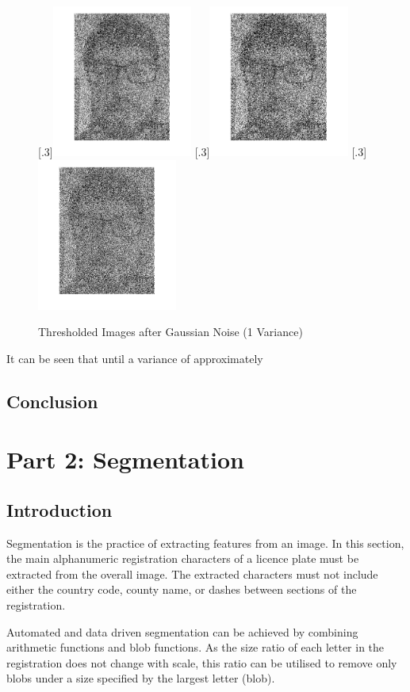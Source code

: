 \documentclass[a4paper]{article}
\begin{document}
	\begin{figure}[H]
		\centering
		[.3\linewidth]{\includegraphics[height=5cm]{Results/Q1/d/qdVar1.jpg}}%
		[.3\linewidth]{\includegraphics[height=5cm]{Results/Q1/d/qdThresh1.jpg}}%
		[.3\linewidth]{\includegraphics[height=5cm]{Results/Q1/d/qd5x51.jpg}}%
		\caption{Thresholded Images after Gaussian Noise (1 Variance)}
		\label{fig:}
	\end{figure}
	\par It can be seen that until a variance of approximately
	\subsection{Conclusion}
	\section{Part 2: Segmentation}
	\subsection{Introduction}
	Segmentation is the practice of extracting features from an image. In
	this section, the main alphanumeric registration characters of a licence
	plate must be extracted from the overall image. The extracted characters
	must not include either the country code, county name, or dashes between
	sections of the registration.
	\par Automated and data driven segmentation can be achieved by combining
	arithmetic functions and blob functions. As the size ratio of each letter in
	the registration does not change with scale, this ratio can be utilised
	to remove only blobs under a size specified by the largest letter
	(blob).
\end{document}
